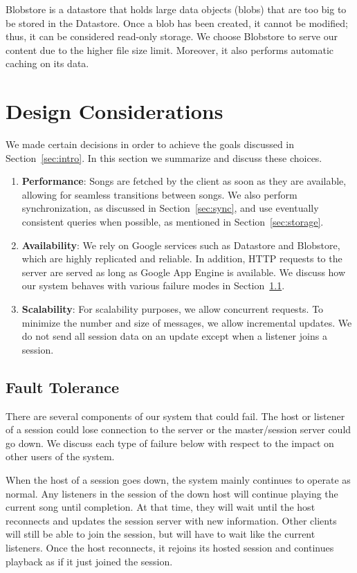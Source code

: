 Blobstore is a datastore that holds large data objects (blobs) that 
are too big to be stored in the Datastore. Once a blob has been 
created, it cannot be modified; thus, it can be considered read-only
storage. We choose Blobstore to serve our content due to the higher
file size limit. Moreover, it also performs automatic caching on its 
data. \cite{appengine}

\section{Design Considerations}
\label{sec:considerations}
We made certain decisions in order to achieve the goals discussed
in Section~\ref{sec:intro}. In this section we summarize and discuss these choices.
\begin{enumerate}
  \item \textbf{Performance}: Songs are fetched by the client as soon as they are available, 
  		allowing for seamless transitions between songs.
  		We also perform synchronization, as discussed in Section~\ref{sec:sync}, 
  		and use eventually consistent queries when possible, as mentioned in 
  		Section~\ref{sec:storage}.
  \item \textbf{Availability}: We rely on Google services such as 
  		Datastore and Blobstore, which are highly replicated and reliable. 
  		In addition, HTTP requests to the server are served as long as 
  		Google App Engine is available. We discuss how our system
		behaves with various failure modes in Section~\ref{sec:faultTolerance}.
  \item \textbf{Scalability}: For scalability purposes, we allow concurrent requests.
  		To minimize the number and size of messages, we allow incremental
  		updates. We do not send all session data on an update except when
  		a listener joins a session.
\end{enumerate}

\subsection{Fault Tolerance}
\label{sec:faultTolerance}
There are several components of our system that could fail. The host or listener
of a session could lose connection to the server or the master/session server
could go down. We discuss each type of
failure below with respect to the impact on other users of the system.

When the host of a session goes down, the system mainly continues
to operate as normal. Any listeners in the session of the down host
will continue playing the current song until completion. At that
time, they will wait until the host reconnects and updates the
session server with new information. Other clients will still be
able to join the session, but will have to wait like the current
listeners. Once the host reconnects, it rejoins its hosted session
and continues playback as if it just joined the session.

